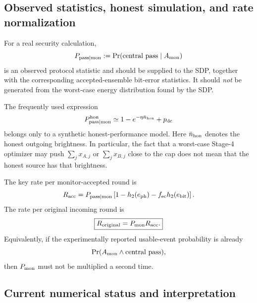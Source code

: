 \documentclass[11pt]{article}
\theoremstyle{remark}
\begin{document}
\subsection{Observed statistics, honest simulation, and rate normalization}

For a real security calculation,
\begin{equation}
    P_{\rm pass|mon}
    :=
    \Pr(\text{central pass}\mid A_{\rm mon})
    \label{eq:stage4-ppass-observed}
\end{equation}
is an observed protocol statistic and should be supplied to the SDP, together
with the corresponding accepted-ensemble bit-error statistics.  It should
\emph{not} be generated from the worst-case energy distribution found by the
SDP.

The frequently used expression
\begin{equation}
    P_{\rm pass|mon}^{\rm hon}
    \simeq
    1-e^{-\eta\bar n_{\rm hon}}+p_{\rm dc}
    \label{eq:stage4-honest-pass}
\end{equation}
belongs only to a synthetic honest-performance model.  Here
\(\bar n_{\rm hon}\) denotes the honest outgoing brightness.  In particular,
the fact that a worst-case Stage-4 optimizer may push
\(\sum_jx_{A,j}\) or \(\sum_jx_{B,j}\) close to the cap does not mean that the
honest source has that brightness.

The key rate per monitor-accepted round is
\begin{equation}
    R_{\rm acc}
    =
    P_{\rm pass|mon}
    \left[
      1-h_2(e_{\rm ph})
      -f_{\rm ec}h_2(e_{\rm bit})
    \right].
    \label{eq:stage4-rate-accepted}
\end{equation}
The rate per original incoming round is
\begin{equation}
    \boxed{
    R_{\rm original}
    =
    P_{\rm mon}R_{\rm acc}.
    }
    \label{eq:stage4-rate-original}
\end{equation}
Equivalently, if the experimentally reported usable-event probability is
already
\[
    \Pr(A_{\rm mon}\wedge\text{central pass}),
\]
then \(P_{\rm mon}\) must not be multiplied a second time.

\subsection{Current numerical status and interpretation}
\end{document}
